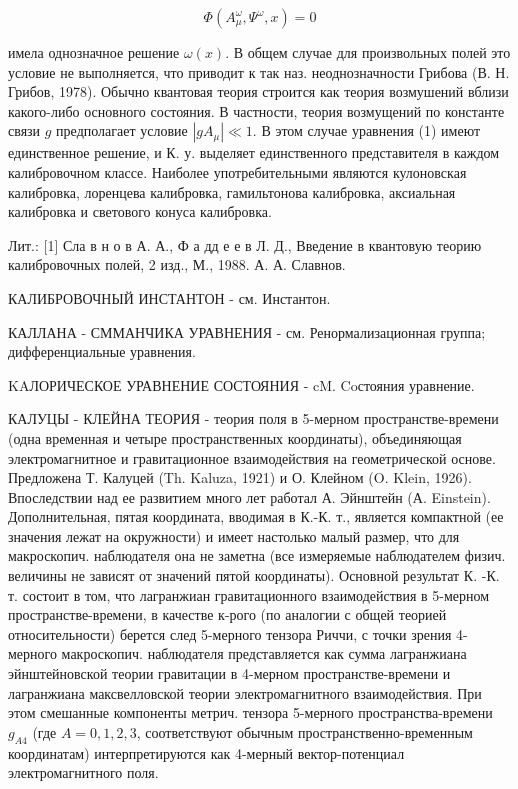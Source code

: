 \documentclass[10pt]{article}
\begin{document}
\[

\Phi\left(A_{\mu}^{\omega}, \Psi^{\omega}, x\right)=0

\]



имела однозначное решение $\omega(x)$. В общем случае для произвольных полей это условие не выполняется, что приводит к так наз. неоднозначности Грибова (В. Н. Грибов, 1978). Обычно квантовая теория строится как теория возмушений вблизи какого-либо основного состояния. В частности, теория возмущений по константе связи $g$ предполагает условие $\left|g A_{\mu}\right| \ll 1$. В этом случае уравнения (1) имеют единственное решение, и К. у. выделяет единственного представителя в каждом калибровочном классе. Наиболее употребительными являются кулоновская калибровка, лоренцева калибровка, гамильтонова калибровка, аксиальная калибровка и светового конуса калибровка.



Лит.: [1] Сла в н о в А. А., Ф а дд е е в Л. Д., Введение в квантовую теорию калибровочных полей, 2 изд., М., 1988. А. А. Славнов.



КАЛИБРОВОЧНЫЙ ИНСТАНТОН - см. Инстантон.



КАЛЛАНА - СММАНЧИКА УРАВНЕНИЯ - см. Ренормализационная группа; дифференциальные уравнения.



KAЛОРИЧЕСКОЕ УРАВНЕНИЕ СОСТОЯНИЯ - cM. Coстояния уравнение.



КАЛУЦЫ - КЛЕЙНА ТЕОРИЯ - теория поля в 5-мерном пространстве-времени (одна временная и четыре пространственных координаты), объединяющая электромагнитное и гравитационное взаимодействия на геометрической основе. Предложена Т. Калуцей (Th. Kaluza, 1921) и О. Клейном (O. Klein, 1926). Впоследствии над ее развитием много лет работал А. Эйнштейн (А. Einstein). Дополнительная, пятая координата, вводимая в К.-К. т., является компактной (ее значения лежат на окружности) и имеет настолько малый размер, что для макроскопич. наблюдателя она не заметна (все измеряемые наблюдателем физич. величины не зависят от значений пятой координаты). Основной результат К. -К. т. состоит в том, что лагранжиан гравитационного взаимодействия в 5-мерном пространстве-времени, в качестве к-рого (по аналогии с общей теорией относительности) берется след 5-мерного тензора Риччи, с точки зрения 4-мерного макроскопич. наблюдателя представляется как сумма лагранжиана эйнштейновской теории гравитации в 4-мерном пространстве-времени и лагранжиана максвелловской теории электромагнитного взаимодействия. При этом смешанные компоненты метрич. тензора 5-мерного пространства-времени $g_{A 4}$ (где $A=0,1,2,3$, соответствуют обычным пространственно-временным координатам) интерпретируются как 4-мерный вектор-потенциал электромагнитного поля.
\end{document}
